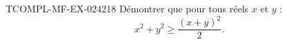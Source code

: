 \begin{exercice}{TCOMPL-MF-EX-024}{2}{18}
Démontrer que pour tous réels $x$ et $y$ :
\[ x^2 + y^2 \geq \frac{(x+y)^2}{2}. \]

\end{exercice}
